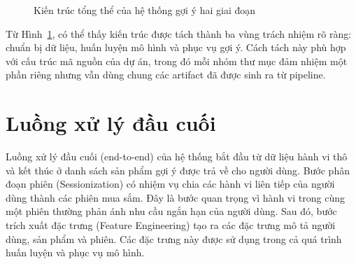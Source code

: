 \begin{figure}[H]
\centering
{}
\caption{Kiến trúc tổng thể của hệ thống gợi ý hai giai đoạn}
\label{fig:system_architecture}
\end{figure}

Từ Hình~\ref{fig:system_architecture}, có thể thấy kiến trúc được tách thành ba vùng trách nhiệm rõ ràng: chuẩn bị dữ liệu, huấn luyện mô hình và phục vụ gợi ý. Cách tách này phù hợp với cấu trúc mã nguồn của dự án, trong đó mỗi nhóm thư mục đảm nhiệm một phần riêng nhưng vẫn dùng chung các artifact đã được sinh ra từ pipeline.

\section{Luồng xử lý đầu cuối}
Luồng xử lý đầu cuối (end-to-end) của hệ thống bắt đầu từ dữ liệu hành vi thô và kết thúc ở danh sách sản phẩm gợi ý được trả về cho người dùng. Bước phân đoạn phiên (Sessionization) có nhiệm vụ chia các hành vi liên tiếp của người dùng thành các phiên mua sắm. Đây là bước quan trọng vì hành vi trong cùng một phiên thường phản ánh nhu cầu ngắn hạn của người dùng. Sau đó, bước trích xuất đặc trưng (Feature Engineering) tạo ra các đặc trưng mô tả người dùng, sản phẩm và phiên. Các đặc trưng này được sử dụng trong cả quá trình huấn luyện và phục vụ mô hình.
\medskip

